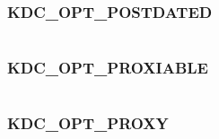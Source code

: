 \documentclass[letterpaper,10pt,english]{sphinxmanual}
\begin{document}
\subsubsection{KDC\_OPT\_POSTDATED}
\label{appdev/refs/macros/KDC_OPT_POSTDATED:kdc-opt-postdated-data}\label{appdev/refs/macros/KDC_OPT_POSTDATED:kdc-opt-postdated}\label{appdev/refs/macros/KDC_OPT_POSTDATED::doc}

\begin{fulllineitems}
\label{appdev/refs/macros/KDC_OPT_POSTDATED:KDC_OPT_POSTDATED}
\end{fulllineitems}


\begin{tabulary}{\linewidth}{|L|L|}
\hline

 & 
\\
\hline\end{tabulary}



\subsubsection{KDC\_OPT\_PROXIABLE}
\label{appdev/refs/macros/KDC_OPT_PROXIABLE:kdc-opt-proxiable-data}\label{appdev/refs/macros/KDC_OPT_PROXIABLE::doc}\label{appdev/refs/macros/KDC_OPT_PROXIABLE:kdc-opt-proxiable}

\begin{fulllineitems}
\label{appdev/refs/macros/KDC_OPT_PROXIABLE:KDC_OPT_PROXIABLE}
\end{fulllineitems}


\begin{tabulary}{\linewidth}{|L|L|}
\hline

 & 
\\
\hline\end{tabulary}



\subsubsection{KDC\_OPT\_PROXY}
\label{appdev/refs/macros/KDC_OPT_PROXY::doc}\label{appdev/refs/macros/KDC_OPT_PROXY:kdc-opt-proxy}\label{appdev/refs/macros/KDC_OPT_PROXY:kdc-opt-proxy-data}
\end{document}
